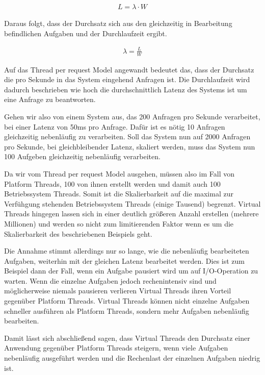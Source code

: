 \documentclass[fontsize=12pt,paper=a4,twoside=semi,parskip=half-,headsepline,headinclude]{scrreprt}
\begin{document}
\begin{eqnarray}
	L = \lambda \cdot W \nonumber
\end{eqnarray}

Daraus folgt, dass der Durchsatz sich aus den gleichzeitig in Bearbeitung befindlichen Aufgaben und der Durchlaufzeit ergibt.

\begin{eqnarray}
	\lambda = \frac{L}{W} \nonumber
\end{eqnarray}

Auf das Thread per request Model angewandt bedeutet das, dass der Durchsatz die pro Sekunde in das System eingehend Anfragen ist. Die Durchlaufzeit wird dadurch beschrieben wie hoch die durchschnittlich Latenz des Systems ist um eine Anfrage zu beantworten. 

Gehen wir also von einem System aus, das 200 Anfragen pro Sekunde verarbeitet, bei einer Latenz von 50ms pro Anfrage. Dafür ist es nötig 10 Anfragen gleichzeitig nebenläufig zu verarbeiten. Soll das System nun auf 2000 Anfragen pro Sekunde, bei gleichbleibender Latenz, skaliert werden, muss das System nun 100  Aufgeben gleichzeitig nebenläufig verarbeiten.

Da wir vom Thread per request Model ausgehen, müssen also im Fall von  Platform Threads, 100 von ihnen erstellt werden und damit auch 100 Betriebssystem Threads. Somit ist die Skalierbarkeit auf die maximal zur Verfühgung stehenden Betriebssystem Threads (einige Tausend) begrenzt. Virtual Threads hingegen lassen sich in einer deutlich größeren Anzahl erstellen (mehrere Millionen) und werden so nicht zum limitierenden Faktor wenn es um die Skalierbarkeit des beschriebenen Beispiels geht.

Die Annahme stimmt allerdings nur so lange, wie die nebenläufig bearbeiteten Aufgaben, weiterhin mit der gleichen Latenz bearbeitet werden. Dies ist zum Beispiel dann der Fall, wenn ein Aufgabe pausiert wird um auf I/O-Operation zu warten. Wenn die einzelne Aufgaben jedoch rechenintensiv sind und möglicherweise niemals pausieren verlieren Virtual Threads ihren Vorteil gegenüber Platform Threads. Virtual Threads können nicht einzelne Aufgaben schneller ausführen als Platform Threads, sondern mehr Aufgaben nebenläufig bearbeiten. 

Damit lässt sich abschließend sagen, dass Virtual Threads den Durchsatz einer Anwendung gegenüber Platform Threads steigern, wenn viele Aufgaben nebenläufig ausgeführt werden und die Rechenlast der einzelnen Aufgaben niedrig ist.
\end{document}
